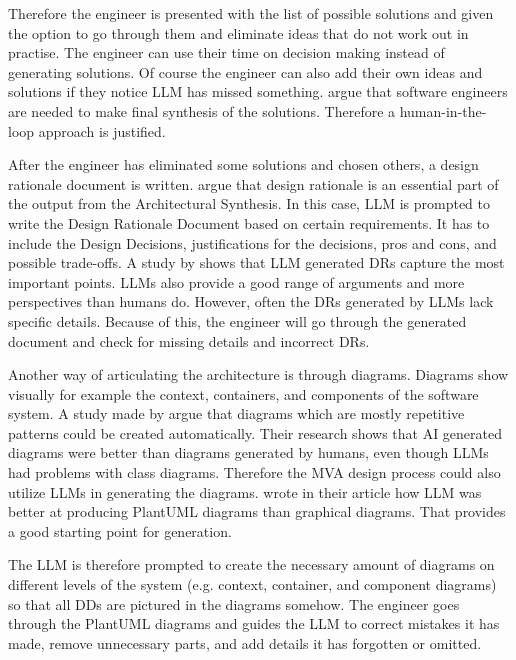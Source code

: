 Therefore the engineer is presented with the list of possible solutions and given the option to go through them and eliminate ideas that do not work out in practise. The engineer can use their time on decision making instead of generating solutions. Of course the engineer can also add their own ideas and solutions if they notice LLM has missed something. \textcite{amasantiImpactAIGeneratedSolutions2026} argue that software engineers are needed to make final synthesis of the solutions. Therefore a human-in-the-loop approach is justified.

After the engineer has eliminated some solutions and chosen others, a design rationale document is written. \textcite{hofmeisterGeneralModelSoftware2007} argue that design rationale is an essential part of the output from the Architectural Synthesis. In this case, LLM is prompted to write the Design Rationale Document based on certain requirements. It has to include the Design Decisions, justifications for the decisions, pros and cons, and possible trade-offs. A study by \textcite{zhouUsingLLMsGenerating2025} shows that LLM generated DRs capture the most important points. LLMs also provide a good range of arguments and more perspectives than humans do. However, often the DRs generated by LLMs lack specific details. Because of this, the engineer will go through the generated document and check for missing details and incorrect DRs.

Another way of articulating the architecture is through diagrams. Diagrams show visually for example the context, containers, and components of the software system. A study made by \textcite{ramachandranTransformingSoftwareArchitecture2025} argue that diagrams which are mostly repetitive patterns could be created automatically. Their research shows that AI generated diagrams were better than diagrams generated by humans, even though LLMs had problems with class diagrams. Therefore the MVA design process could also utilize LLMs in generating the diagrams. \textcite{tagliaferroLeveragingLLMsAutomate2025} wrote in their article how LLM was better at producing PlantUML diagrams than graphical diagrams. That provides a good starting point for generation.

The LLM is therefore prompted to create the necessary amount of diagrams on different levels of the system (e.g. context, container, and component diagrams) so that all DDs are pictured in the diagrams somehow. The engineer goes through the PlantUML diagrams and guides the LLM to correct mistakes it has made, remove unnecessary parts, and add details it has forgotten or omitted.

